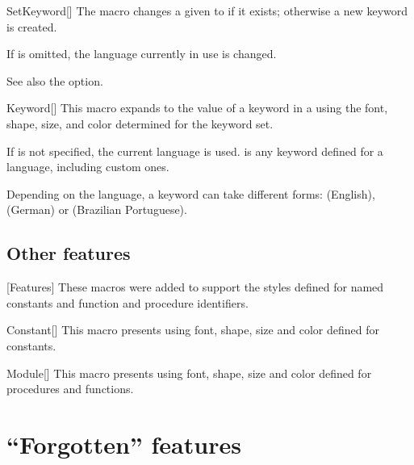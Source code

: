 \documentclass[a4paper, 11pt]{article}
\begin{document}
\begin{macro}{SetKeyword}[]
    The macro  changes a given  to  if it exists; otherwise a new keyword is created.

    If  is omitted, the language currently in use is changed.

    See also the  option.
\end{macro}

\begin{macro}{Keyword}[]
    This macro expands to the value of a keyword in a  using the font, shape, size, and color determined for the keyword set.

    If  is not specified, the current language is used.  is any keyword defined for a language, including custom ones.
\end{macro}

\begin{tcblisting}{}
    Depending on the language, a keyword can take different forms:  (English),  (German) or  (Brazilian Portuguese).
\end{tcblisting}

\subsection{Other features}

[Features]%
These macros were added to support the styles defined for named constants and function and procedure identifiers.

\begin{macro}{Constant}[]
    This macro presents  using font, shape, size and color defined for constants.
\end{macro}

\begin{macro}{Module}[]
    This macro presents  using font, shape, size and color defined for procedures and functions.
\end{macro}


\section{``Forgotten'' features}
\end{document}

